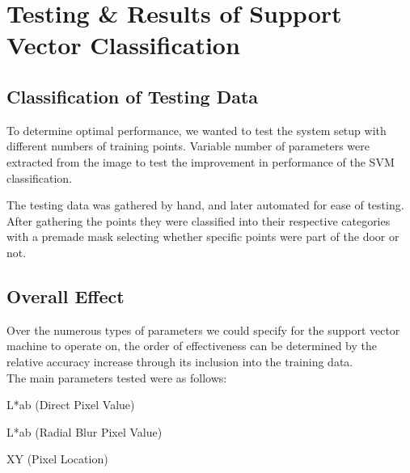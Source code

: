 \chapter {Testing \& Results of Support Vector Classification}

\section{Classification of Testing Data}
To determine optimal performance, we wanted to test the system setup with different numbers of training points. Variable number of parameters were extracted from the image to test the improvement in performance of the SVM classification.

The testing data was gathered by hand, and later automated for ease of testing. After gathering the points they were classified into their respective categories with a premade mask selecting whether specific points were part of the door or not.

\section{Overall Effect}

Over the numerous types of parameters we could specify for the support vector machine to operate on, the order of effectiveness can be determined by the relative accuracy increase through its inclusion into the training data. 
\\
The main parameters tested were as follows:

\begin{description}
  \item L*ab (Direct Pixel Value)
  \item L*ab (Radial Blur Pixel Value)
  \item XY (Pixel Location)
\end{description}


